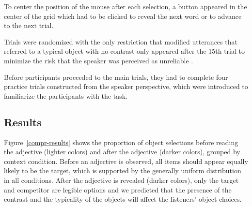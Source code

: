 \documentclass[10pt,letterpaper]{article}
\begin{document}
To center the position of the mouse after each selection, a button appeared in the center of the grid which had to be clicked to reveal the next word or to advance to the next trial. 

Trials were randomized with the only restriction that modified utterances that referred to a typical object with no contrast only appeared after the 15th trial to minimize the risk that the speaker was perceived as unreliable \cite{Grodner:2011}.

Before participants proceeded to the main trials, they had to complete four practice trials constructed from the speaker perspective, which were introduced to familiarize the participants with the task.


\subsection{Results}
Figure~\ref{compr-results} shows the proportion of object selections before reading the adjective (lighter colors) and after the adjective (darker colors), grouped by context condition. Before an adjective is observed, all items should appear equally likely to be the target, which is supported by the generally uniform distribution in all conditions. After the adjective is revealed (darker colors), only the target and competitor are legible options and we predicted that the presence of the contrast and the typicality of the objects will affect the listeners' object choices.
\end{document}
